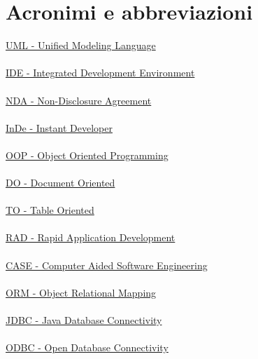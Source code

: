 \chapter{Acronimi e abbreviazioni}

\noindent \hyperref[UMLl]{UML - Unified Modeling Language}
\\
\\
\noindent \hyperref[IDE]{IDE - Integrated Development Environment}
\\
\\
\noindent \hyperref[NDA]{NDA - Non-Disclosure Agreement}
\\
\\
\noindent \hyperref[InDe]{InDe - Instant Developer}
\\
\\
\noindent \hyperref[OOP]{OOP - Object Oriented Programming}
\\
\\
\noindent \hyperref[DO]{DO - Document Oriented}
\\
\\
\noindent \hyperref[TO]{TO - Table Oriented}
\\
\\
\noindent \hyperref[RAD]{RAD - Rapid Application Development}
\\
\\
\noindent \hyperref[CASE]{CASE - Computer Aided Software Engineering}
\\
\\
\noindent \hyperref[ORM]{ORM - Object Relational Mapping}
\\
\\
\noindent \hyperref[JDBC]{JDBC - Java Database Connectivity}
\\
\\
\noindent \hyperref[ODBC]{ODBC - Open Database Connectivity}
\\
\\
